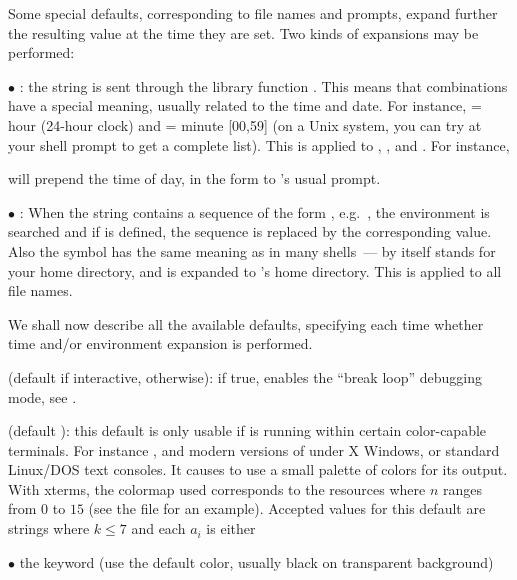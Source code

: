 Some special defaults, corresponding to file names and prompts, expand further
the resulting value at the time they are set. Two kinds of expansions may be
performed:

$\bullet$ : the string is sent through the library
function . This means that \kbd{\%} combinations have
a special meaning, usually related to the time and date. For instance,
 = hour (24-hour clock) and  = minute [00,59] (on a Unix
system, you can try  at your shell prompt to get a complete
list). This is applied to , , and . For
instance,


\noindent
will prepend the time of day, in the form 
to 's usual prompt.

$\bullet$ : When the string contains a sequence of
the form , e.g.~, the environment is
searched and if  is defined, the sequence is replaced by the
corresponding value. Also the \kbd{\til} symbol has the same meaning as in
many shells~--- \kbd{\til} by itself stands for your home directory, and
 is expanded to 's home directory. This is applied
to all file names. \label{se:envir}

We shall now describe all the available defaults, specifying each time
whether time and/or environment expansion is performed.

 (default  if interactive,  otherwise):
if true, enables the ``break loop'' debugging mode, see .

 (default ): this default is only usable if
\label{se:colors}
is running within certain color-capable terminals. For instance ,
 and modern versions of  under X Windows, or
standard Linux/DOS text consoles. It causes  to use a small palette of
colors for its output. With xterms, the colormap used corresponds to the
resources  where $n$ ranges from $0$ to $15$ (see the
file  for an example). Accepted values for this
default are strings  where $k\le7$ and each
$a_i$ is either

\noindent $\bullet$ the keyword  (use the default color, usually
black on transparent background)

